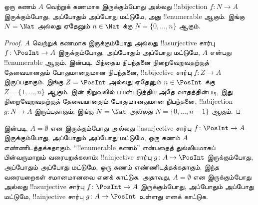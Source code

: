 \documentclass[../../../include/open-logic-section]{subfiles}
\begin{document}
\begin{cor}
ஒரு கணம் $A$ வெற்றுக் கணமாக இருக்கும்போது அல்லது
!!a{bijection} $f\colon N \to A$ இருக்கும்போது,
அப்போதும் அப்போது மட்டுமே, அது !!{enumerable} ஆகும்.
இங்கு $N = \Nat$ அல்லது ஏதேனும் $n \in \Nat$ க்கு
$N = \{0, \dots, n\}$ ஆகும்.
\end{cor}

\begin{proof}
$A$ வெற்றுக் கணமாக இருக்கும்போது அல்லது
!!a{surjective} சார்பு $f\colon \PosInt \to A$ இருக்கும்போது,
அப்போதும் அப்போது மட்டுமே, $A$ என்பது !!{enumerable} ஆகும்.
 இன்படி, பிந்தைய நிபந்தனை நிறைவேறுவதற்குத்
தேவையானதும் போதுமானதுமான நிபந்தனை,
!!a{bijective} சார்பு $f\colon Z \to A$ இருப்பதாகும்.
இங்கு $Z =
\PosInt$ அல்லது ஏதேனும் $n \in \PosInt$ க்கு
$Z = \{1, \dots, n\}$ ஆகும்.
 இன் நிறுவலில் பயன்படுத்திய அதே வாதத்தின்படி,
இது நிறைவேறுவதற்குத் தேவையானதும் போதுமானதுமான நிபந்தனை,
!!a{bijection} $g\colon N \to A$ இருப்பதாகும்;
இங்கு $N = \Nat$ அல்லது $N = \{0, \dots, n-1\}$ ஆகும்.
\end{proof}

\begin{prob}
 இன்படி,
$A = \emptyset$ என இருக்கும்போது அல்லது
!!a{surjective} சார்பு $f\colon
\PosInt \to A$ இருக்கும்போது, அப்போதும் அப்போது மட்டுமே,
ஒரு கணம் $A$ எண்ணிடத்தக்கதாகும்.
“!!{enumerable} கணம்” என்பதைத் துல்லியமாகப் பின்வருமாறும்
வரையறுக்கலாம்: !!a{injective} சார்பு
$g\colon A \to \PosInt$ இருக்கும்போது,
அப்போதும் அப்போது மட்டுமே, ஒரு கணம் எண்ணிடத்தக்கதாகும்.
இந்த வரையறைகள் சமானமானவை எனக் காட்டுக.
அதாவது, $A = \emptyset$ என இருக்கும்போது அல்லது
!!a{surjective} சார்பு $f\colon \PosInt \to A$ இருக்கும்போது,
அப்போதும் அப்போது மட்டுமே,
!!a{injective} சார்பு $g\colon A \to \PosInt$ உள்ளது எனக் காட்டுக.
\end{prob}
\end{document}
